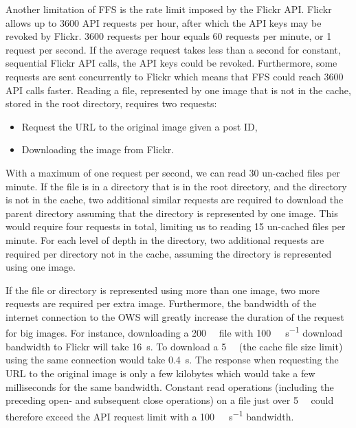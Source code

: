 Another limitation of \gls{FFS} is the rate limit imposed by the Flickr \gls{API}. Flickr allows up to \num{3600} \gls{API} requests per hour, after which the \gls{API} keys may be revoked by Flickr. \num{3600} requests per hour equals \num{60} requests per minute, or \num{1} request per second. If the average request takes less than a second for constant, sequential Flickr \gls{API} calls, the \gls{API} keys could be revoked. Furthermore, some requests are sent concurrently to Flickr which means that \gls{FFS} could reach \num{3600} \gls{API} calls faster. Reading a file, represented by one image that is not in the cache, stored in the root directory, requires two requests:
\begin{itemize}
	\item Request the URL to the original image given a post ID,
	\item Downloading the image from Flickr. 
\end{itemize}
With a maximum of one request per second, we can read \num{30} un-cached files per minute. If the file is in a directory that is in the root directory, and the directory is not in the cache, two additional similar requests are required to download the parent directory assuming that the directory is represented by one image. This would require four requests in total, limiting us to reading \num{15} un-cached files per minute. For each level of depth in the directory, two additional requests are required per directory not in the cache, assuming the directory is represented using one image. 

If the file or directory is represented using more than one image, two more requests are required per extra image. Furthermore, the bandwidth of the internet connection to the \gls{OWS} will greatly increase the duration of the request for big images. For instance, downloading a \SI[per-mode = symbol]{200}{\mega\byte} file with \SI[per-mode = symbol]{100}{\mega\bit\per\second} download bandwidth to Flickr will take \SI[per-mode = symbol]{16}{\second}. To download a \SI[per-mode = symbol]{5}{\mega\byte} (the cache file size limit) using the same connection would take \SI[per-mode = symbol]{0.4}{\second}. The response when requesting the URL to the original image is only a few kilobytes which would take a few milliseconds for the same bandwidth. Constant read operations (including the preceding open- and subsequent close operations) on a file just over \SI[per-mode = symbol]{5}{\mega\byte} could therefore exceed the \gls{API} request limit with a \SI[per-mode = symbol]{100}{\mega\bit\per\second} bandwidth.

